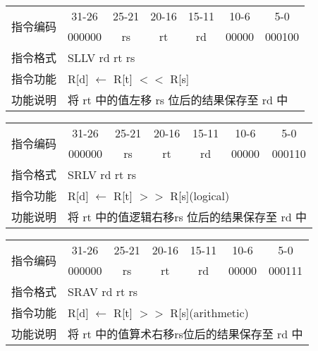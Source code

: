 \documentclass[a4paper,UTF8,fntef]{ctexart}
\begin{document}
	\begin{table}[!hbp]
		\centering
		\begin{tabular}{|c|c|c|c|c|c|c|}
		\hline
		\multirow{2}{*}{指令编码} & 31-26&25-21 & 20-16&15-11 &10-6 &5-0\\
		\cline{2-7} & 000000 & rs & rt & rd & 00000& 000100 \\
		\hline
		指令格式&\multicolumn{6}{|l|}{SLLV rd rt rs}\\
		\hline		
		指令功能&\multicolumn{6}{|l|}{R[d] $\leftarrow$  R[t] $<<$ R[s]}\\
		\hline		
		功能说明&\multicolumn{6}{|l|}{将 rt 中的值左移 rs 位后的结果保存至 rd 中}\\
		\hline
		\end{tabular}
	\end{table}
	\begin{table}[!hbp]
		\centering
		\begin{tabular}{|c|c|c|c|c|c|c|}
		\hline
		\multirow{2}{*}{指令编码} & 31-26&25-21 & 20-16&15-11 &10-6 &5-0\\
		\cline{2-7} & 000000 & rs & rt & rd & 00000& 000110 \\
		\hline
		指令格式&\multicolumn{6}{|l|}{SRLV rd rt rs}\\
		\hline		
		指令功能&\multicolumn{6}{|l|}{R[d] $\leftarrow$  R[t] $>>$ R[s](logical)}\\
		\hline		
		功能说明&\multicolumn{6}{|l|}{将 rt 中的值逻辑右移rs 位后的结果保存至 rd 中}\\
		\hline
		\end{tabular}
	\end{table}
	\begin{table}[!hbp]
		\centering
		\begin{tabular}{|c|c|c|c|c|c|c|}
		\hline
		\multirow{2}{*}{指令编码} & 31-26&25-21 & 20-16&15-11 &10-6 &5-0\\
		\cline{2-7} & 000000 & rs & rt & rd & 00000& 000111 \\
		\hline
		指令格式&\multicolumn{6}{|l|}{SRAV rd rt rs}\\
		\hline		
		指令功能&\multicolumn{6}{|l|}{R[d] $\leftarrow$  R[t] $>>$ R[s](arithmetic)}\\
		\hline		
		功能说明&\multicolumn{6}{|l|}{将 rt 中的值算术右移rs位后的结果保存至 rd 中}\\
		\hline
		\end{tabular}
	\end{table}
\newpage
\end{document}
